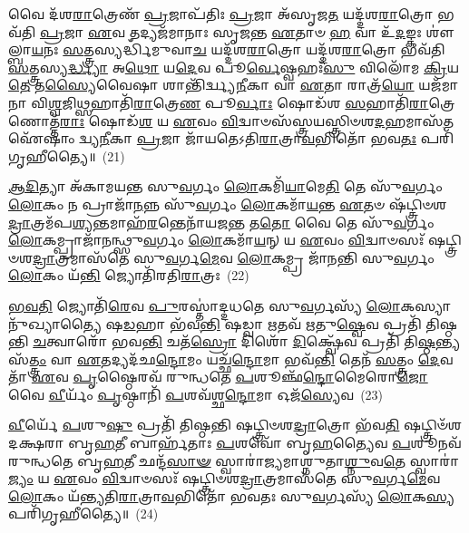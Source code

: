 𑌵𑍈 𑌦᳴𑌶\-\ul{𑌰𑌾}\-𑌤𑍍𑌰𑍇𑌣᳴ \ul{𑌪𑍍𑌰}\-𑌜𑌾𑌪᳴𑌤𑌿𑌃 \ul{𑌪𑍍𑌰}\-𑌜𑌾 𑌅᳴𑌸𑍃𑌜\-\ul{𑌤} 𑌯𑌦𑍍𑌦᳴𑌶\-\ul{𑌰𑌾}\-𑌤𑍍𑌰𑍋 𑌭𑌵᳴𑌤𑌿 \ul{𑌪𑍍𑌰}\-𑌜𑌾 \ul{𑌏}\-𑌵 𑌤𑌦𑍍𑌯𑌜᳴𑌮𑌾𑌨𑌾𑌃 𑌸𑍃𑌜𑌨𑍍𑌤 \ul{𑌏}\-𑌤𑌾𑍞 \ul{𑌹} 𑌵𑌾 𑌉᳴\-\ul{𑌦}\-𑌙𑍍𑌕𑌃 𑌶𑍗॑𑌲𑍍𑌬𑌾\-\ul{𑌯}\-𑌨𑌃 \ul{𑌸}\-𑌤𑍍𑌤𑍍𑌰𑌸𑍍𑌯𑌰𑍍𑌦𑍍𑌧𑌿᳴𑌮𑍁𑌵𑌾\-\ul{𑌚} 𑌯𑌦𑍍𑌦᳴𑌶\-\ul{𑌰𑌾}\-𑌤𑍍𑌰𑍋 𑌯𑌦𑍍𑌦᳴𑌶\-\ul{𑌰𑌾}\-𑌤𑍍𑌰𑍋 𑌭𑌵᳴𑌤𑌿 \ul{𑌸}\-𑌤𑍍𑌤𑍍𑌰𑌸𑍍𑌯\-\ul{𑌰𑍍𑌦𑍍𑌧𑍍𑌯𑌾} 𑌅\-\ul{𑌥𑍋} 𑌯\-\ul{𑌦𑍇}\-𑌵 𑌪𑍂\-\ul{𑌰𑍍𑌵𑍇}\-𑌷𑍍𑌵𑌹𑌃᳴\-\ul{𑌸𑍁} 𑌵𑌿𑌲𑍋᳴𑌮 \ul{𑌕𑍍𑌰𑌿}\-𑌯\-\ul{𑌤𑍇} 𑌤\-\ul{𑌸𑍍𑌯𑍈}\-𑌵𑍈𑌷𑌾 𑌶𑌾𑌨𑍍𑌤𑌿᳴𑌰𑍍𑌦𑍍𑌵𑍍𑌯\-\ul{𑌨𑍀}\-𑌕𑌾 𑌵𑌾 \ul{𑌏}\-𑌤𑌾 𑌰𑌾𑌤𑍍𑌰᳴\-\ul{𑌯𑍋} 𑌯𑌜᳴𑌮𑌾𑌨𑌾 𑌵𑌿\-\ul{𑌶𑍍𑌵}\-𑌜𑌿\-\ul{𑌥𑍍𑌸}\-𑌹𑌾𑌤𑌿᳴\-\ul{𑌰𑌾}\-𑌤𑍍𑌰𑍇\-\ul{𑌣} 𑌪𑍂\-\ul{𑌰𑍍𑌵𑌾𑌃} 𑌷𑍋𑌡᳴𑌶 \ul{𑌸}\-𑌹𑌾𑌤𑌿᳴\-\ul{𑌰𑌾}\-𑌤𑍍𑌰𑍇𑌣𑍋𑌤𑍍𑌤᳴\-\ul{𑌰𑌾𑌃} 𑌷𑍋𑌡᳴\-\ul{𑌶} 𑌯 \ul{𑌏}\-𑌵𑌂 \ul{𑌵𑌿}\-𑌦𑍍𑌵𑌾𑍞𑌸᳴𑌸𑍍𑌤𑍍𑌰𑌯𑌸𑍍𑌤𑍍𑌰𑌿𑍞𑌶\-\ul{𑌦}\-𑌹𑌮𑌾𑌸᳴\-\ul{𑌤} 𑌐᳴𑌷𑌾𑌂॑ 𑌦𑍍𑌵𑍍𑌯\-\ul{𑌨𑍀}\-𑌕𑌾 \ul{𑌪𑍍𑌰}\-𑌜𑌾 𑌜𑌾᳴𑌯𑌤𑍇\-𑌽𑌤𑌿\-\ul{𑌰𑌾}\-𑌤𑍍𑌰𑌾\-\ul{𑌵}\-𑌭𑌿𑌤𑍋᳴ 𑌭𑌵\-\ul{𑌤𑌃} 𑌪𑌰𑌿᳴𑌗𑍃𑌹𑍀𑌤𑍍𑌯𑍈॥~(21)

{\anuvakamend[{\-\ul{𑌅}\-\-\ul{𑌹}\-\-\ul{𑌰}\-\-\ul{𑌨𑍍𑌨𑍇}\-𑌷𑍍𑌵᳴𑌵𑌾\-\ul{𑌨𑍍𑌤}\-𑌰𑍞 𑌷𑍋𑌡᳴𑌶 \ul{𑌸}\-𑌹 \ul{𑌸}\-𑌪𑍍𑌤𑌦᳴𑌶 𑌚}]}%

\-\ul{𑌆}\-\-\ul{𑌦𑌿}\-𑌤𑍍𑌯𑌾 𑌅᳴𑌕𑌾𑌮𑌯𑌨𑍍𑌤 𑌸𑍁\-\ul{𑌵}\-𑌰𑍍𑌗𑌂 \ul{𑌲𑍋}\-𑌕𑌮𑌿᳴\-\ul{𑌯𑌾}\-𑌮𑍇\-\ul{𑌤𑌿} 𑌤𑍇 𑌸𑍁᳴\-\ul{𑌵}\-𑌰𑍍𑌗𑌂 \ul{𑌲𑍋}\-𑌕𑌂 𑌨 𑌪𑍍𑌰𑌾𑌜𑌾᳴\-\ul{𑌨}\-𑌨𑍍𑌨 𑌸𑍁᳴\-\ul{𑌵}\-𑌰𑍍𑌗𑌂 \ul{𑌲𑍋}\-𑌕𑌮𑌾᳴\-\ul{𑌯}\-𑌨𑍍𑌤 \ul{𑌏}\-𑌤𑍞 𑌷᳴𑌟𑍍𑌤𑍍𑌰𑌿𑍞𑌶\-\ul{𑌦𑍍𑌰𑌾}\-𑌤𑍍𑌰𑌮᳴𑌪\-\ul{𑌶𑍍𑌯}\-𑌨𑍍𑌤𑌮𑌾𑌹᳴\-\ul{𑌰}\-𑌨𑍍𑌤𑍇𑌨𑌾᳴𑌯𑌜\-\ul{𑌨𑍍𑌤} 𑌤\-\ul{𑌤𑍋} 𑌵𑍈 𑌤𑍇 𑌸𑍁᳴\-\ul{𑌵}\-𑌰𑍍𑌗𑌂 \ul{𑌲𑍋}\-𑌕𑌮𑍍𑌪𑍍𑌰𑌾𑌜𑌾᳴𑌨𑌨𑍍𑌥𑍍𑌸𑍁\-\ul{𑌵}\-𑌰𑍍𑌗𑌂 \ul{𑌲𑍋}\-𑌕𑌮𑌾᳴\-\ul{𑌯}\-𑌨𑍍 𑌯 \ul{𑌏}\-𑌵𑌂 \ul{𑌵𑌿}\-𑌦𑍍𑌵𑌾𑍞𑌸𑌃᳴ 𑌷𑌟𑍍𑌤𑍍𑌰𑌿𑍞𑌶\-\ul{𑌦𑍍𑌰𑌾}\-𑌤𑍍𑌰𑌮𑌾𑌸᳴𑌤𑍇 𑌸𑍁\-\ul{𑌵}\-𑌰𑍍𑌗\-\ul{𑌮𑍇}\-𑌵 \ul{𑌲𑍋}\-𑌕𑌮𑍍𑌪𑍍𑌰 𑌜𑌾᳴𑌨𑌨𑍍𑌤𑌿 𑌸𑍁\-\ul{𑌵}\-𑌰𑍍𑌗𑌂 \ul{𑌲𑍋}\-𑌕𑌂 𑌯᳴\-\ul{𑌨𑍍𑌤𑌿} 𑌜𑍍𑌯𑍋𑌤𑌿᳴𑌰𑌤𑌿\-\ul{𑌰𑌾}\-𑌤𑍍𑌰𑌃~(22)

\-\ul{𑌭}\-\-\ul{𑌵}\-\-\ul{𑌤𑌿} 𑌜𑍍𑌯𑍋𑌤𑌿᳴\-\ul{𑌰𑍇}\-𑌵 \ul{𑌪𑍁}\-𑌰𑌸𑍍𑌤𑌾॑𑌦𑍍𑌦𑌧𑌤𑍇 𑌸𑍁\-\ul{𑌵}\-𑌰𑍍𑌗𑌸𑍍𑌯᳴ \ul{𑌲𑍋}\-𑌕𑌸𑍍𑌯𑌾𑌨𑍁᳴𑌖𑍍𑌯𑌾𑌤𑍍𑌯𑍈 𑌷\-\ul{𑌡}\-𑌹𑌾 𑌭᳴𑌵\-\ul{𑌨𑍍𑌤𑌿} 𑌷𑌡𑍍𑌵𑌾 \ul{𑌋}\-𑌤𑌵᳴ \ul{𑌋}\-𑌤𑍁\-\ul{𑌷𑍍𑌵𑍇}\-𑌵 𑌪𑍍𑌰𑌤𑌿᳴ 𑌤𑌿𑌷𑍍𑌠𑌨𑍍𑌤𑌿 \ul{𑌚}\-𑌤𑍍𑌵𑌾𑌰𑍋᳴ 𑌭𑌵\-\ul{𑌨𑍍𑌤𑌿} 𑌚𑌤᳴\-\ul{𑌸𑍍𑌰𑍋} 𑌦𑌿𑌶𑍋᳴ \ul{𑌦𑌿}\-𑌕𑍍𑌷𑍍𑌵𑍇᳴𑌵 𑌪𑍍𑌰𑌤𑌿᳴ 𑌤𑌿\-\ul{𑌷𑍍𑌠}\-𑌨𑍍𑌤𑍍𑌯𑌸᳴\-\ul{𑌤𑍍𑌤𑍍𑌰𑌂} 𑌵𑌾 \ul{𑌏}\-𑌤𑌦𑍍𑌯𑌦᳴𑌛\-\ul{𑌨𑍍𑌦𑍋}\-𑌮𑌂 𑌯𑌚𑍍𑌛᳴\-\ul{𑌨𑍍𑌦𑍋}\-𑌮𑌾 𑌭𑌵᳴\-\ul{𑌨𑍍𑌤𑌿} 𑌤𑍇𑌨᳴ \ul{𑌸}\-𑌤𑍍𑌤𑍍𑌰𑌂 \ul{𑌦𑍇}\-𑌵𑌤𑌾᳴ \ul{𑌏}\-𑌵 \ul{𑌪𑍃}\-𑌷𑍍𑌠𑍈𑌰𑌵᳴ 𑌰𑍁𑌨𑍍𑌧𑌤𑍇 \ul{𑌪}\-𑌶𑍂𑌞𑍍𑌛᳴\-\ul{𑌨𑍍𑌦𑍋}\-𑌮𑍈𑌰𑍋\-\ul{𑌜𑍋} 𑌵𑍈 \ul{𑌵𑍀}\-𑌰𑍍𑌯𑌂᳴ \ul{𑌪𑍃}\-𑌷𑍍𑌠𑌾𑌨𑌿᳴ \ul{𑌪}\-𑌶𑌵᳴𑌶𑍍𑌛\-\ul{𑌨𑍍𑌦𑍋}\-𑌮𑌾 𑌓𑌜᳴\-\ul{𑌸𑍍𑌯𑍇}\-𑌵~(23)

\-\ul{𑌵𑍀}\-𑌰𑍍𑌯𑍇᳴ \ul{𑌪}\-𑌶𑍁\-\ul{𑌷𑍁} 𑌪𑍍𑌰𑌤𑌿᳴ 𑌤𑌿𑌷𑍍𑌠𑌨𑍍𑌤𑌿 𑌷𑌟𑍍𑌤𑍍𑌰𑌿𑍞𑌶\-\ul{𑌦𑍍𑌰𑌾}\-𑌤𑍍𑌰𑍋 𑌭᳴𑌵\-\ul{𑌤𑌿} 𑌷𑌟𑍍𑌤𑍍𑌰𑌿𑍞᳴𑌶𑌦𑌕𑍍𑌷𑌰𑌾 𑌬𑍃\-\ul{𑌹}\-𑌤𑍀 𑌬𑌾𑌰𑍍\mbox{}𑌹᳴𑌤𑌾𑌃 \ul{𑌪}\-𑌶𑌵𑍋᳴ 𑌬𑍃\-\ul{𑌹}\-𑌤𑍍𑌯𑍈𑌵 \ul{𑌪}\-𑌶𑍂𑌨𑌵᳴ 𑌰𑍁𑌨𑍍𑌧𑌤𑍇 𑌬𑍃\-\ul{𑌹}\-𑌤𑍀 𑌛𑌨𑍍𑌦᳴\-\ul{𑌸𑌾}\-\-\ul{𑍟} 𑌸𑍍𑌵𑌾𑌰𑌾॑𑌜𑍍𑌯𑌮𑌾𑌶𑍍𑌨𑍁𑌤𑌾\-\ul{𑌶𑍍𑌨𑍁}\-𑌵\-\ul{𑌤𑍇} 𑌸𑍍𑌵𑌾𑌰𑌾॑\-\ul{𑌜𑍍𑌯𑌂} 𑌯 \ul{𑌏}\-𑌵𑌂 \ul{𑌵𑌿}\-𑌦𑍍𑌵𑌾𑍞𑌸𑌃᳴ 𑌷𑌟𑍍𑌤𑍍𑌰𑌿𑍞𑌶\-\ul{𑌦𑍍𑌰𑌾}\-𑌤𑍍𑌰𑌮𑌾𑌸᳴𑌤𑍇 𑌸𑍁\-\ul{𑌵}\-𑌰𑍍𑌗\-\ul{𑌮𑍇}\-𑌵 \ul{𑌲𑍋}\-𑌕𑌂 𑌯᳴𑌨𑍍𑌤𑍍𑌯𑌤𑌿\-\ul{𑌰𑌾}\-𑌤𑍍𑌰𑌾\-\ul{𑌵}\-𑌭𑌿𑌤𑍋᳴ 𑌭𑌵𑌤𑌃 𑌸𑍁\-\ul{𑌵}\-𑌰𑍍𑌗𑌸𑍍𑌯᳴ \ul{𑌲𑍋}\-𑌕\-\ul{𑌸𑍍𑌯} 𑌪𑌰𑌿᳴𑌗𑍃𑌹𑍀𑌤𑍍𑌯𑍈॥~(24)

